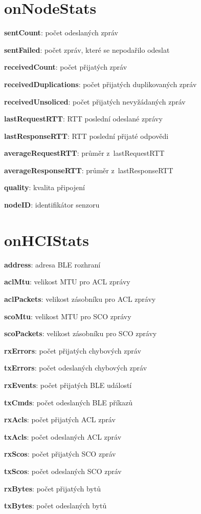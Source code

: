 \documentclass[thesis=M,czech]{FITthesis}[2012/06/26]
\begin{document}
\section{onNodeStats}
\begin{description}
 \item \textbf{sentCount}: počet odeslaných zpráv
 \item \textbf{sentFailed}: počet zpráv, které se nepodařilo odeslat
 \item \textbf{receivedCount}: počet přijatých zpráv
 \item \textbf{receivedDuplications}: počet přijatých duplikovaných zpráv
 \item \textbf{receivedUnsoliced}: počet přijatých nevyžádaných zpráv
 \item \textbf{lastRequestRTT}: RTT poslední odeslané zprávy
 \item \textbf{lastResponseRTT}: RTT poslední přijaté odpovědi
 \item \textbf{averageRequestRTT}: průměr z~lastRequestRTT
 \item \textbf{averageResponseRTT}: průměr z~lastResponseRTT
 \item \textbf{quality}: kvalita připojení
 \item \textbf{nodeID}: identifikátor senzoru
\end{description}

\section{onHCIStats}
\begin{description}
 \item \textbf{address}: adresa BLE rozhraní 
 \item \textbf{aclMtu}: velikost MTU pro ACL zprávy
 \item \textbf{aclPackets}: velikost zásobníku pro ACL zprávy 
 \item \textbf{scoMtu}: velikost MTU pro SCO zprávy
 \item \textbf{scoPackets}: velikost zásobníku pro SCO zprávy
 \item \textbf{rxErrors}: počet přijatých chybových zpráv
 \item \textbf{txErrors}: počet odeslaných chybových zpráv
 \item \textbf{rxEvents}: počet přijatých BLE událostí
 \item \textbf{txCmds}: počet odeslaných BLE příkazů
 \item \textbf{rxAcls}: počet přijatých ACL zpráv
 \item \textbf{txAcls}: počet odeslaných ACL zpráv
 \item \textbf{rxScos}: počet přijatých SCO zpráv
 \item \textbf{txScos}: počet odeslaných SCO zpráv
 \item \textbf{rxBytes}: počet přijatých bytů
 \item \textbf{txBytes}: počet odeslaných bytů
\end{description}
\end{document}
